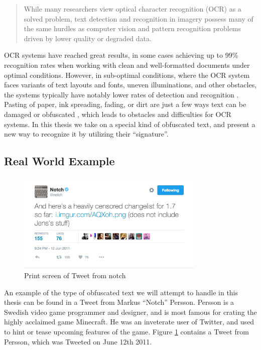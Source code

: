 \begin{quote}
    While many researchers view optical character recognition (OCR) as a solved problem, text detection and recognition in imagery possess many of the same hurdles as computer vision and pattern recognition problems driven by lower quality or degraded data.
\end{quote}

OCR systems have reached great results, in some cases achieving up to 99\% recognition rates when working with clean and well-formatted documents under optimal conditions. However, in sub-optimal conditions, where the OCR system faces variants of text layouts and fonts, uneven illuminations, and other obstacles, the systems typically have notably lower rates of detection and recognition \citep{ye2015text}. Pasting of paper, ink spreading, fading, or dirt are just a few ways text can be damaged or obfuscated \citep{bhardwaj2014imaging}, which leads to obstacles and difficulties for OCR systems. In this thesis we take on a special kind of obfuscated text, and present a new way to recognize it by utilizing their ``signature''.

\subsection{Real World Example}
\begin{figure}[ht]
    \centering
    \includegraphics[width=0.8\textwidth]{fig/chapter1/notch_tweet.png}
    \caption{Print screen of Tweet from notch}
    \label{ref:notch_twitter}
\end{figure}

An example of the type of obfuscated text we will attempt to handle in this thesis can be found in a Tweet from Markus ``Notch'' Persson. Persson is a Swedish video game programmer and designer, and is most famous for crating the highly acclaimed game Minecraft. He was an inveterate user of Twitter, and used to hint or tease upcoming features of the game. Figure \ref{ref:notch_twitter} contains a Tweet from Persson, which was Tweeted on June 12th 2011.

